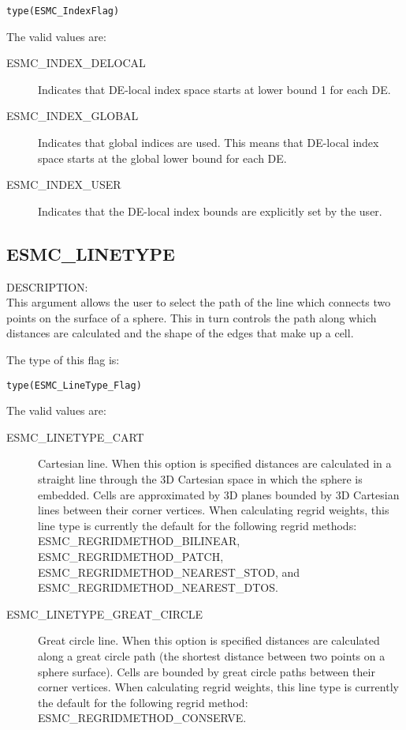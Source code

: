{\tt type(ESMC\_IndexFlag)}

The valid values are:
\begin{description}
\item [ESMC\_INDEX\_DELOCAL]
      Indicates that DE-local index space starts at lower bound 1 for each DE.
\item [ESMC\_INDEX\_GLOBAL]
      Indicates that global indices are used. This means that DE-local index
      space starts at the global lower bound for each DE.
\item [ESMC\_INDEX\_USER]
      Indicates that the DE-local index bounds are explicitly set by the user.
\end{description}

\subsection{ESMC\_LINETYPE}
\label{opt:lineType}

{\sf DESCRIPTION:\\}  This argument allows the user to select the path of the 
line which connects two points on the surface of a sphere.
This in turn controls the path along which distances are calculated and the 
shape of the edges that make up a cell.

The type of this flag is:

{\tt type(ESMC\_LineType\_Flag)}

The valid values are:
\begin{description}
\item [ESMC\_LINETYPE\_CART]
    Cartesian line. When this option is specified distances are calculated in a 
    straight line through the 3D Cartesian space in which the sphere is 
    embedded. Cells are approximated by 3D planes bounded by 3D Cartesian lines 
    between their corner vertices.
    When calculating regrid weights, this line type is currently the default for 
    the following regrid methods: ESMC\_REGRIDMETHOD\_BILINEAR,
    ESMC\_REGRIDMETHOD\_PATCH, ESMC\_REGRIDMETHOD\_NEAREST\_STOD, and 
    ESMC\_REGRIDMETHOD\_NEAREST\_DTOS.
\item [ESMC\_LINETYPE\_GREAT\_CIRCLE]
    Great circle line. When this option is specified distances are calculated 
    along a great circle path (the shortest distance between two points on a 
    sphere surface). Cells are bounded by great circle paths between their 
    corner vertices. When calculating regrid weights, this line type is 
    currently the default for the following regrid method: 
    ESMC\_REGRIDMETHOD\_CONSERVE.
\end{description}


